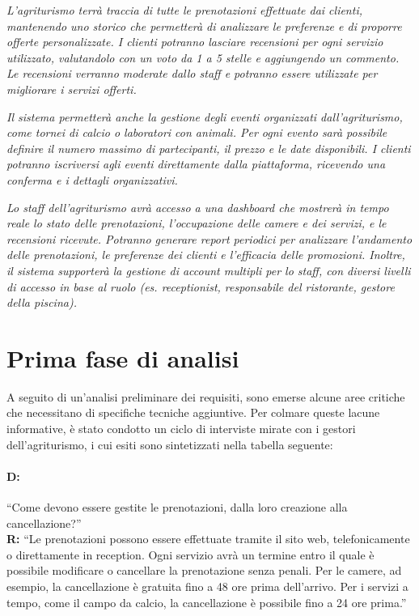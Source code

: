 \documentclass[a4paper,11pt]{report}
\begin{document}
\textit{L'agriturismo terrà traccia di tutte le prenotazioni effettuate dai clienti, mantenendo uno storico che permetterà
	di analizzare le preferenze e di proporre offerte personalizzate. I clienti potranno lasciare recensioni per ogni servizio utilizzato, valutandolo
	con un voto da 1 a 5 stelle e aggiungendo un commento. Le recensioni verranno moderate dallo staff e potranno essere utilizzate per
	migliorare i servizi offerti.}

\textit{Il sistema permetterà anche la gestione degli eventi organizzati dall'agriturismo, come tornei di calcio o laboratori con animali. Per ogni
	evento sarà possibile definire il numero massimo di partecipanti, il prezzo e le date disponibili. I clienti potranno iscriversi agli eventi direttamente
	dalla piattaforma, ricevendo una conferma e i dettagli organizzativi.}

\textit{Lo staff dell'agriturismo avrà accesso a una dashboard che mostrerà in tempo reale lo stato delle prenotazioni, l'occupazione delle
	camere e dei servizi, e le recensioni ricevute. Potranno generare report periodici per analizzare l'andamento delle prenotazioni, le preferenze dei clienti e
	l'efficacia delle promozioni. Inoltre, il sistema supporterà la gestione di account multipli per lo staff, con diversi livelli di accesso in base al
	ruolo (es. receptionist, responsabile del ristorante, gestore della piscina).}

\section{Prima fase di analisi}
A seguito di un'analisi preliminare dei requisiti, sono emerse alcune aree critiche che necessitano di specifiche tecniche
aggiuntive. Per colmare queste lacune informative, è stato condotto un ciclo di interviste mirate con i gestori dell'agriturismo, i
cui esiti sono sintetizzati nella tabella seguente:

\paragraph{D:}
“Come devono essere gestite le prenotazioni, dalla loro creazione alla cancellazione?”
\\ {\bf R:} “Le prenotazioni possono essere effettuate tramite il sito web, telefonicamente o direttamente in reception. Ogni servizio avrà un termine
entro il quale è possibile modificare o cancellare la prenotazione senza penali. Per le camere, ad esempio, la cancellazione è gratuita fino a 48 ore prima
dell'arrivo. Per i servizi a tempo, come il campo da calcio, la cancellazione è possibile fino a 24 ore prima.”
\end{document}
